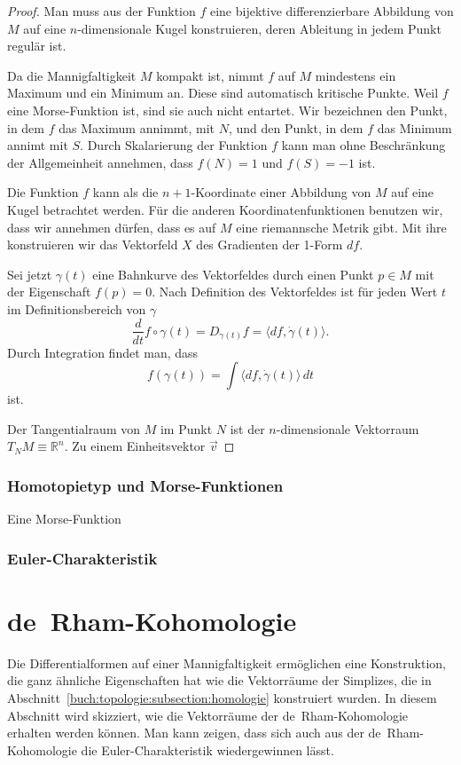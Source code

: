 \begin{proof}
Man muss aus der Funktion $f$ eine bijektive differenzierbare Abbildung
von $M$ auf eine $n$-dimensionale Kugel konstruieren, deren Ableitung
in jedem Punkt regulär ist.

Da die Mannigfaltigkeit $M$ kompakt ist, nimmt $f$ auf $M$ mindestens
ein Maximum und ein Minimum an.
Diese sind automatisch kritische Punkte.
Weil $f$ eine Morse-Funktion ist, sind sie auch nicht entartet.
Wir bezeichnen den Punkt, in dem $f$ das Maximum annimmt, mit $N$,
und den Punkt, in dem $f$ das Minimum annimt mit $S$.
Durch Skalarierung der Funktion $f$ kann man ohne Beschränkung der
Allgemeinheit annehmen, dass $f(N)=1$ und $f(S) = -1$ ist.

Die Funktion $f$ kann als die $n+1$-Koordinate einer Abbildung von $M$ 
auf eine Kugel betrachtet werden.
Für die anderen Koordinatenfunktionen benutzen wir, dass wir annehmen
dürfen, dass es auf $M$ eine riemannsche Metrik gibt.
Mit ihre konstruieren wir das Vektorfeld $X$ des Gradienten der 1-Form $df$.

Sei jetzt $\gamma(t)$ eine Bahnkurve des Vektorfeldes durch einen Punkt
$p\in M$ mit der Eigenschaft $f(p)=0$.
Nach Definition des Vektorfeldes ist für jeden Wert $t$ im Definitionsbereich
von $\gamma$
\[
\frac{d}{dt}f\circ\gamma(t)
=
D_{\dot{\gamma}(t)} f
=
\langle df, \dot{\gamma}(t) \rangle.
\]
Durch Integration findet man, dass
\[
f(\gamma(t))
=
\int \langle df,\dot{\gamma}(t)\rangle \,dt
\]
ist.



Der Tangentialraum von $M$ im Punkt $N$ ist der
$n$-dimensionale Vektorraum $T_NM\equiv \mathbb{R}^n$.
Zu einem Einheitsvektor $\vec{v}$ 

\end{proof}

\subsubsection{Homotopietyp und Morse-Funktionen}
Eine Morse-Funktion 

\subsubsection{Euler-Charakteristik}


%
%
\section{de~Rham-Kohomologie}
Die Differentialformen auf einer Mannigfaltigkeit ermöglichen eine
Konstruktion, die ganz ähnliche Eigenschaften hat wie die Vektorräume
der Simplizes, die in Abschnitt~\ref{buch:topologie:subsection:homologie}
konstruiert wurden.
In diesem Abschnitt wird skizziert, wie die Vektorräume der
de~Rham-Kohomologie erhalten werden können.
Man kann zeigen, dass sich auch aus der de~Rham-Kohomologie die
Euler-Charakteristik wiedergewinnen lässt.

